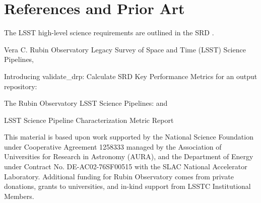 
\section{References and Prior Art}

The LSST high-level science requirements are outlined in the SRD  \cite{LPM-17}. 

Vera C. Rubin Observatory Legacy Survey of Space and Time (LSST) Science Pipelines, 
\cite{2019ASPC..523..521B, 10.1093/pasj/psx080}

Introducing validate\_drp: Calculate SRD Key Performance Metrics for an output repository: 
\cite{DMTN-008}

The Rubin Observatory LSST Science Pipelines: 
 \cite{2019ASPC..523..521B} and \cite{10.1093/pasj/psx080}

LSST Science Pipeline Characterization Metric Report
\cite{DMTR-311}


\acknowledgments
This material is based upon work supported by the National Science Foundation under Cooperative Agreement 1258333 managed by the Association of Universities for Research in Astronomy (AURA), and the Department of Energy under Contract No. DE-AC02-76SF00515 with the SLAC National Accelerator Laboratory. 
Additional funding for Rubin Observatory comes from private donations, grants to universities, and in-kind support from LSSTC Institutional Members.

